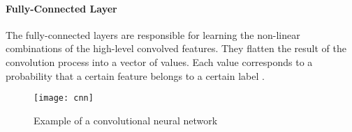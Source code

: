 \paragraph{Fully-Connected Layer}
The fully-connected layers are responsible for learning the non-linear combinations of the high-level convolved features.
They flatten the result of the convolution process into a vector of values.
Each value corresponds to a probability that a certain feature belongs to a certain label \cite{cnn_tds}.

\begin{figure}[t]
  \centering
  \texttt{[image: cnn]}
  \caption{Example of a convolutional neural network \cite{cnn_tds}}
  \label{fig:cnn}
\end{figure}
